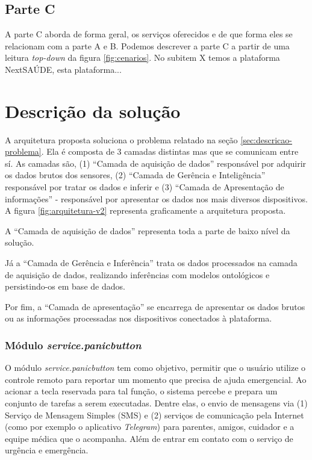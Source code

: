 \subsection{Parte C} \label{subsec:parte-c}

A parte C aborda de forma geral, os serviços oferecidos e de que forma eles se
relacionam com a parte A e B. Podemos descrever a parte C a partir de uma leitura 
\textit{top-down} da figura \ref{fig:cenarios}. No subitem X temos a plataforma
NextSAÚDE, esta plataforma...

\section{Descrição da solução}
\label{sec:descricao-solucao}

A arquitetura proposta soluciona o problema relatado na seção  
\ref{sec:descricao-problema}. Ela é composta de 3 camadas distintas mas que
se comunicam entre sí. As camadas são, (1) ``Camada de aquisição de dados''
responsável por adquirir os dados brutos dos sensores, (2) ``Camada de Gerência 
e Inteligência'' responsável por tratar os dados e inferir e (3) ``Camada de 
Apresentação de informações'' - responsável por apresentar os dados nos mais
diversos dispositivos. A figura \ref{fig:arquitetura-v2} representa graficamente
a arquitetura proposta.



A ``Camada de aquisição de dados'' representa toda a parte de baixo nível da
solução.

Já a ``Camada de Gerência e Inferência'' trata os dados processados na camada
de aquisição de dados, realizando inferências com modelos ontológicos e 
persistindo-os em base de dados.

Por fim, a ``Camada de apresentação'' se encarrega de apresentar os dados brutos
ou as informações processadas nos dispositivos conectados à plataforma.


\subsubsection{Módulo \textit{service.panicbutton}}\label{subsubsec:panicbutton}

O módulo \textit{service.panicbutton} tem como objetivo, permitir que o usuário
utilize o controle remoto para reportar um momento que precisa de ajuda 
emergencial. Ao acionar a tecla reservada para tal função, o sistema percebe e
prepara um conjunto de tarefas a serem executadas. Dentre elas, o envio de 
mensagens via (1) Serviço de Mensagem Simples (SMS) e (2) serviços de comunicação
pela Internet (como por exemplo o aplicativo \textit{Telegram}) para parentes, 
amigos, cuidador e a equipe médica que o acompanha. Além de entrar em contato
com o serviço de urgência e emergência.

